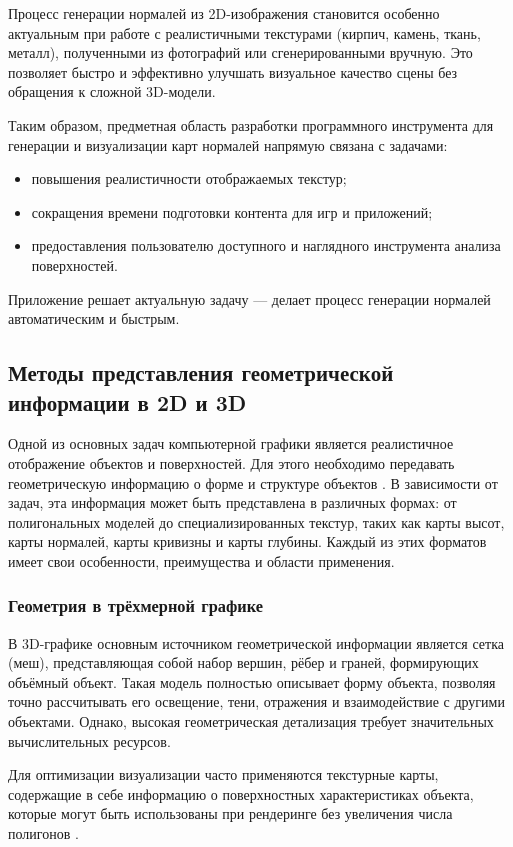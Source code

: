 Процесс генерации нормалей из 2D-изображения становится особенно актуальным при работе с реалистичными текстурами (кирпич, камень, ткань, металл), полученными из фотографий или сгенерированными вручную. Это позволяет быстро и эффективно улучшать визуальное качество сцены без обращения к сложной 3D-модели.

Таким образом, предметная область разработки программного инструмента для генерации и визуализации карт нормалей напрямую связана с задачами:
\begin{itemize}
	\item повышения реалистичности отображаемых текстур;
	\item сокращения времени подготовки контента для игр и приложений;
	\item предоставления пользователю доступного и наглядного инструмента анализа поверхностей.
\end{itemize}

Приложение решает актуальную задачу — делает процесс генерации нормалей автоматическим и быстрым.
\subsection{Методы представления геометрической информации в 2D и 3D}

Одной из основных задач компьютерной графики является реалистичное отображение объектов и поверхностей. Для этого необходимо передавать геометрическую информацию о форме и структуре объектов \cite{reed2020}. В зависимости от задач, эта информация может быть представлена в различных формах: от полигональных моделей до специализированных текстур, таких как карты высот, карты нормалей, карты кривизны и карты глубины. Каждый из этих форматов имеет свои особенности, преимущества и области применения.
\subsubsection{Геометрия в трёхмерной графике}

В 3D-графике основным источником геометрической информации является сетка (меш), представляющая собой набор вершин, рёбер и граней, формирующих объёмный объект. Такая модель полностью описывает форму объекта, позволяя точно рассчитывать его освещение, тени, отражения и взаимодействие с другими объектами. Однако, высокая геометрическая детализация требует значительных вычислительных ресурсов.

Для оптимизации визуализации часто применяются текстурные карты, содержащие в себе информацию о поверхностных характеристиках объекта, которые могут быть использованы при рендеринге без увеличения числа полигонов \cite{thalmann2021}.

